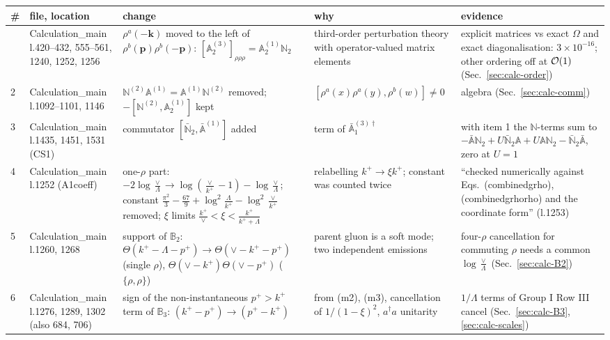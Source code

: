 \documentclass[10pt]{article}
\def\mf#1{\mathbb{#1}}
\begin{document}
{\small
\setlength{\LTleft}{0pt}\setlength{\LTright}{0pt}
\begin{longtable}{@{}p{0.4cm}p{2.7cm}p{5.0cm}p{4.0cm}p{4.0cm}@{}}
\toprule
\# & file, location & change & why & evidence\\
\midrule\endhead
\bottomrule\endfoot
1 & Calculation\_main l.420--432, 555--561, 1240, 1252, 1256 & $\rho^{a}(-\mathbf{k})$ moved to the left of $\rho^{b}(\mathbf{p})\rho^{b}(-\mathbf{p})$: $[\mf{A}^{(3)}_{2}]_{\rho\rho\rho}=\mf{A}^{(1)}_{2}\mf{N}_{2}$ & third-order perturbation theory with operator-valued matrix elements & explicit matrices vs exact $\Omega$ and exact diagonalisation: $3\times10^{-16}$; other ordering off at ${\cal O}(1)$ (Sec.~\ref{sec:calc-order})\\
2 & Calculation\_main l.1092--1101, 1146 & $\mf{N}^{(2)}\mf{A}^{(1)}=\mf{A}^{(1)}\mf{N}^{(2)}$ removed; $-[\mf{N}^{(2)},\mf{A}^{(1)}_{2}]$ kept & $[\rho^{a}(x)\rho^{a}(y),\rho^{b}(w)]\neq0$ & algebra (Sec.~\ref{sec:calc-comm})\\
3 & Calculation\_main l.1435, 1451, 1531 (CS1) & commutator $[\bar{\mf{N}}_{2},\bar{\mf{A}}^{(1)}]$ added & term of $\bar{\mf{A}}^{(3)\dagger}_{1}$ & with item 1 the $\mf{N}$-terms sum to $-\bar{\mf A}\mf N_2+U\bar{\mf N}_2\mf A+U\mf A\mf N_2-\bar{\mf N}_2\bar{\mf A}$, zero at $U=1$\\
4 & Calculation\_main l.1252 (A1coeff) & one-$\rho$ part: $-2\log\frac{\vee}{\Lambda}\to\log(\frac{\vee}{k^{+}}-1)-\log\frac{\vee}{\Lambda}$; constant $\frac{\pi^{2}}{3}-\frac{67}{9}+\log^{2}\frac{\Lambda}{k^{+}}-\log^{2}\frac{\vee}{k^{+}}$ removed; $\xi$ limits $\frac{k^{+}}{\vee}<\xi<\frac{k^{+}}{k^{+}+\Lambda}$ & relabelling $k^{+}\to\xi k^{+}$; constant was counted twice & ``checked numerically against Eqs.\ (combinedgrho), (combinedgrhorho) and the coordinate form'' (l.1253)\\
5 & Calculation\_main l.1260, 1268 & support of $\mf{B}_{2}$: $\Theta(k^{+}-\Lambda-p^{+})\to\Theta(\vee-k^{+}-p^{+})$ (single $\rho$), $\Theta(\vee-k^{+})\Theta(\vee-p^{+})$ ($\{\rho,\rho\}$) & parent gluon is a soft mode; two independent emissions & four-$\rho$ cancellation for commuting $\rho$ needs a common $\log\frac{\vee}{\Lambda}$ (Sec.~\ref{sec:calc-B2})\\
6 & Calculation\_main l.1276, 1289, 1302 (also 684, 706) & sign of the non-instantaneous $p^{+}>k^{+}$ term of $\mf{B}_{3}$: $(k^{+}-p^{+})\to(p^{+}-k^{+})$ & from (m2), (m3), cancellation of $1/(1-\xi)^{2}$, $a^{\dagger}a$ unitarity & $1/\Lambda$ terms of Group I Row III cancel (Sec.~\ref{sec:calc-B3}, \ref{sec:calc-scales})\\

\end{longtable}}
\end{document}
